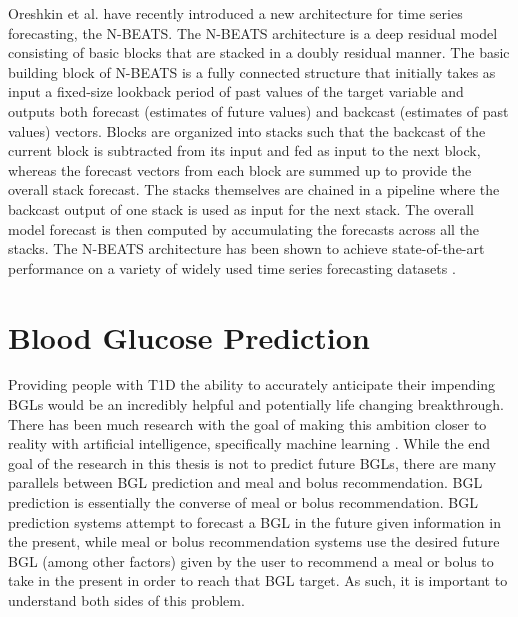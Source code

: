 
Oreshkin et al. have recently introduced a new architecture for time series forecasting, the \ac{N-BEATS}\cite{oreshkin:nbeats}. The \ac{N-BEATS} architecture is a deep residual model consisting of basic blocks that are stacked in a doubly residual manner. The basic building block of \ac{N-BEATS} is a fully connected structure that initially takes as input a fixed-size lookback period of past values of the target variable and outputs both forecast (estimates of future values) and backcast (estimates of past values) vectors. Blocks are organized into stacks such that the backcast of the current block is subtracted from its input and fed as input to the next block, whereas the forecast vectors from each block are summed up to provide the overall stack forecast. The stacks themselves are chained in a pipeline where the backcast output of one stack is used as input for the next stack. The overall model forecast is then computed by accumulating the forecasts across all the stacks. The \ac{N-BEATS} architecture has been shown to achieve state-of-the-art performance on a variety of widely used time series forecasting datasets \cite{oreshkin:nbeats}. %

\section{Blood Glucose Prediction}

Providing people with \ac{T1D} the ability to accurately anticipate their impending \ac{BGLs} would be an incredibly helpful and potentially life changing breakthrough. There has been much research with the goal of making this ambition closer to reality with artificial intelligence, specifically machine learning \cite{bunescu:svr_bgl,mirshekarian:bgl_pred,rubin_falcone:nbeats_bgl}. While the end goal of the research in this thesis is not to predict future \ac{BGLs}, there are many parallels between \ac{BGL} prediction and meal and bolus recommendation. \ac{BGL} prediction is essentially the converse of meal or bolus recommendation. \ac{BGL} prediction systems attempt to forecast a \ac{BGL} in the future given information in the present, while meal or bolus recommendation systems use the desired future \ac{BGL} (among other factors) given by the user to recommend a meal or bolus to take in the present in order to reach that \ac{BGL} target. As such, it is important to understand both sides of this problem.

